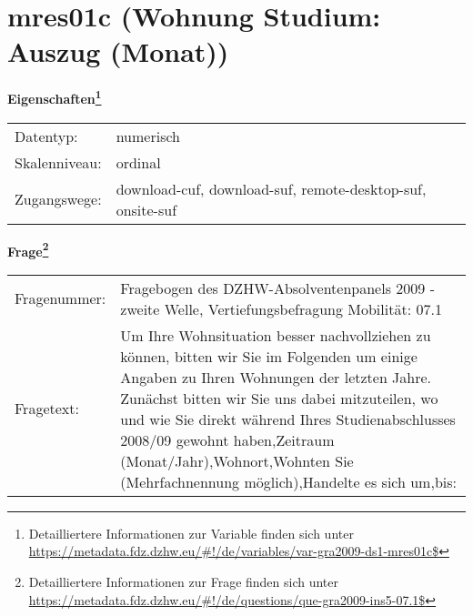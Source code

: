 
    \setcounter{footnote}{0}

    \vspace*{-1.8cm}
	\section{mres01c (Wohnung Studium: Auszug (Monat))}
	\label{section:mres01c}



    \vspace*{0.5cm}
    \noindent\textbf{Eigenschaften\footnote{Detailliertere Informationen zur Variable finden sich unter
		\url{https://metadata.fdz.dzhw.eu/\#!/de/variables/var-gra2009-ds1-mres01c$}}}\\
	\begin{tabularx}{\hsize}{@{}lX}
	Datentyp: & numerisch \\
	Skalenniveau: & ordinal \\
	Zugangswege: &
	  download-cuf, 
	  download-suf, 
	  remote-desktop-suf, 
	  onsite-suf
 \\
    \end{tabularx}



				\vspace*{0.5cm}
                \noindent\textbf{Frage\footnote{Detailliertere Informationen zur Frage finden sich unter
		              \url{https://metadata.fdz.dzhw.eu/\#!/de/questions/que-gra2009-ins5-07.1$}}}\\
				\begin{tabularx}{\hsize}{@{}lX}
					Fragenummer: &
					  Fragebogen des DZHW-Absolventenpanels 2009 - zweite Welle, Vertiefungsbefragung Mobilität:
					  07.1
 \\
					Fragetext: & Um Ihre Wohnsituation besser nachvollziehen zu können, bitten wir Sie im Folgenden um einige Angaben zu Ihren Wohnungen der letzten Jahre. Zunächst bitten wir Sie uns dabei mitzuteilen, wo und wie Sie direkt während Ihres Studienabschlusses 2008/09 gewohnt haben,Zeitraum (Monat/Jahr),Wohnort,Wohnten Sie (Mehrfachnennung möglich),Handelte es sich um,bis: \\
				\end{tabularx}





